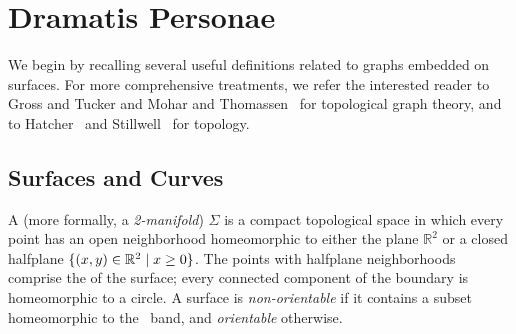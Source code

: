 \documentclass{sig-alternate}
\def\note#1{\EMPH{\color{red} #1}}
\def\Real{\mathbb{R}}
\begin{document}

\section{Dramatis Personae}
\label{S:background}



We begin by recalling several useful definitions related to graphs
embedded on surfaces.  For more comprehensive treatments, we refer
the interested reader to Gross and Tucker \cite{gt-tgt-01} and Mohar
and Thomassen~\cite{mt-gos-01} for topological graph theory, and to
Hatcher~\cite{h-at-01} and Stillwell~\cite{s-ctcgt-93} for topology.




\subsection{Surfaces and Curves}

A  (more formally, a \emph{2-manifold}) $\Sigma$ is a
compact topological space in which every point has an open
neighborhood homeomorphic to either the plane $\Real^2$ or a closed
halfplane $\set{(x,y)\in \Real^2\mid x\ge 0}$.  The points with
halfplane neighborhoods comprise the  of the surface;
every connected component of the boundary is homeomorphic to a
circle.  A surface is \emph{non-orientable} if it contains a
subset homeomorphic to the \Mobius\ band, and \emph{orientable}
otherwise.
\end{document}
